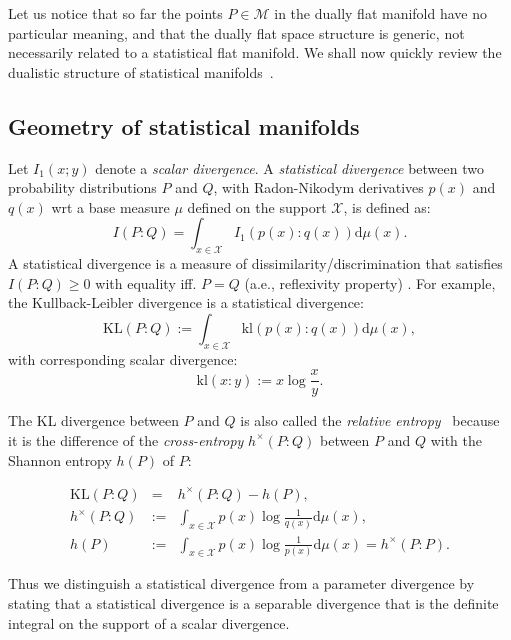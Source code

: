 \documentclass[graybox]{svmult}
\def\dmu{\mathrm{d}\mu}
\def\KL{\mathrm{KL}}
\def\kl{\mathrm{kl}}
\def\eqdef{:=}
\def\calX{\mathcal{X}}
\def\calM{\mathcal{M}}
\begin{document}
Let us notice that so far the points $P\in\calM$ in the dually flat manifold have no particular meaning, and that the dually flat space structure is generic, not necessarily related to a statistical flat manifold.
We shall now quickly review the dualistic structure of statistical manifolds~\cite{Lauritzen-1987}.


\subsection{Geometry of statistical manifolds}\label{sec:geosf}
Let $I_1(x;y)$ denote a {\em scalar divergence}.
A {\em statistical divergence}  between two probability distributions $P$ and $Q$, with Radon-Nikodym derivatives $p(x)$ and $q(x)$ wrt a base measure $\mu$ defined on the support $\calX$, is defined as:
\begin{equation}
I(P:Q)=\int_{x\in\calX} I_1\left(p(x):q(x)\right) \dmu(x).
\end{equation}
A  statistical divergence is a measure of dissimilarity/discrimination that satisfies $I(P:Q)\geq 0$ with equality iff. $P=Q$ (a.e., reflexivity property) . 
For example, the Kullback-Leibler divergence is a statistical divergence:
\begin{equation}
\KL(P:Q)\eqdef \int_{x\in\calX} \kl(p(x):q(x)) \dmu(x),
\end{equation}
with corresponding scalar divergence:
\begin{equation}
\kl(x:y) \eqdef x\log\frac{x}{y}.
\end{equation}

The KL divergence between $P$ and $Q$ is also called the {\em relative entropy}~\cite{Cover-2012} because it is the difference of the 
{\em cross-entropy} $h^\times(P:Q)$ between $P$ and $Q$ with the {Shannon entropy} $h(P)$ of $P$:
 
\begin{eqnarray}
\KL(P:Q) &=& h^\times(P:Q)-h(P),\\
h^\times(P:Q) &\eqdef &\int_{x\in\calX} p(x)\log \frac{1}{q(x)} \dmu(x),\\
h(P) &\eqdef& \int_{x\in\calX} p(x)\log \frac{1}{p(x)} \dmu(x)= h^\times(P:P).
\end{eqnarray}

Thus we distinguish a statistical divergence from a parameter divergence by stating that   a statistical divergence is a separable divergence that is the definite integral on the support of a scalar divergence.
\end{document}
